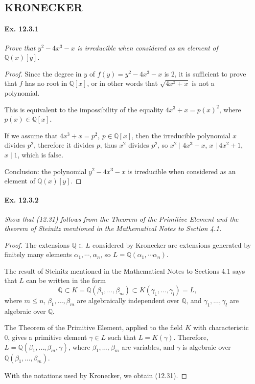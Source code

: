\documentclass[11pt,a4paper]{article}
\newcommand{\Q}{\mathbb{Q}}
\begin{document}
\subsection{KRONECKER}

\paragraph{Ex. 12.3.1}

{\it Prove that $y^2 - 4x^3 -x$ is irreducible when considered as an element of $\Q(x)[y]$.
}

\begin{proof}
Since the degree in $y$ of $f(y) = y^2 - 4x^3 -x$ is 2, it is sufficient to prove that $f$ has no root in $\Q[x]$, or in other words that $\sqrt{4x^3 + x}$ is not a polynomial.

This is equivalent to the impossibility of the equality $4x^3 + x = p(x)^2$, where $p(x)\in \Q[x]$.

If we assume that $4x^3 + x = p^2,\  p \in \Q[x]$, then the irreducible polynomial $x$ divides $p^2$, therefore it divides $p$, thus $x^2$ divides $p^2$, so $x^2 \mid 4x^3 + x$, $x \mid 4x^2 + 1$, $x \mid 1$, which is false.

Conclusion: the polynomial $y^2 - 4x^3 -x$ is irreducible when considered as an element of $\Q(x)[y]$.
\end{proof}

\paragraph{Ex. 12.3.2}

{\it Show that (12.31) follows from the Theorem of the Primitive Element and the theorem of Steinitz mentioned in the Mathematical Notes to Section 4.1.
}

\begin{proof}
The extensions $\Q \subset L$ considered by Kronecker are extensions generated by finitely many elements $\alpha_1,\cdots,\alpha_n$, so $L = \Q(\alpha_1,\cdots\alpha_n)$.

The result of Steinitz mentioned in the Mathematical Notes to Sections 4.1 says that $L$ can be written in the form
$$\Q \subset K = \Q(\beta_1,\ldots,\beta_m) \subset K(\gamma_1,\ldots,\gamma_l) = L,$$
where $m\leq n$, $\beta_1,\ldots,\beta_m$ are algebraically independent over $\Q$, and $\gamma_1,\ldots,\gamma_l$ are algebraic over $\Q$.

The Theorem of the Primitive Element, applied to the field $K$ with characteristic $0$, gives a primitive element $\gamma \in L$ such that $L = K(\gamma)$.
Therefore, $L = \Q(\beta_1,\ldots,\beta_m, \gamma)$, where $\beta_1,\ldots,\beta_m$ are variables, and $\gamma$ is algebraic over $\Q(\beta_1,\ldots,\beta_m)$.

With the notations used by Kronecker, we obtain (12.31).
\end{proof}
\end{document}
